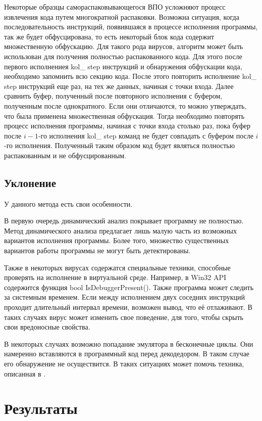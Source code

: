 \documentclass[oneside, final, 14pt]{extreport}
\begin{document}
Некоторые образцы самораспаковывающегося ВПО усложняют процесс извлечения кода путем многократной распаковки. Возможна ситуация, когда последовательность инструкций, появившаяся в процессе исполнения программы, так же будет обфусцирована, то есть некоторый блок кода содержит множественную обфускацию. Для такого рода вирусов, алгоритм может быть использован для получения полностью распакованного кода. Для этого после первого исполнениея kol\_ step инструкций и обнаружения обфускации кода, необходимо запомнить всю секцию кода. После этого повторить исполнение kol\_ step инструкций еще раз, на тех же данных, начиная с точки входа. Далее сравнить буфер, полученный после повторного исполнения с буфером, полученным после однократного. Если они отличаются, то можно утверждать, что была применена множественная обфускация. Тогда необходимо повторять процесс исполнения программы, начиная с точки входа столько раз, пока буфер после  \(i-1\)-го исполнения kol\_ step команд не будет совпадать с буфером после \(i\)-го исполнения. Полученный таким образом код будет являться полностью распакованным и не обфусцированным. 

\section{Уклонение}
У данного метода есть свои особенности.

В первую очередь динамический анализ покрывает программу не полностью. Метод динамического анализа предлагает лишь малую часть из возможных вариантов исполнения программы. Более того, множество существенных вариантов работы программы не могут быть детектированы. 

Также в некоторых вирусах содержатся специальные техники, способные проверять на исполнение в виртуальной среде. Например, в Win32 API содержится функция bool IsDebuggerPresent(). Также программа может следить за системным временем. Если между исполнением двух соседних инструкций проходит длительный интервал времени, возможен вывод, что её отлаживают. В таких случаях вирус может изменить свое поведение, для того, чтобы скрыть свои вредоносные свойства. 

В некоторых случаях возможно попадание эмулятора в бесконечные циклы. Они намеренно вставляются в программный код перед декодедором. В таком случае его обнаружение не осуществится. В таких ситуациях может помочь техника, описанная в \cite{loop}.

\chapter{Результаты}
\end{document}
